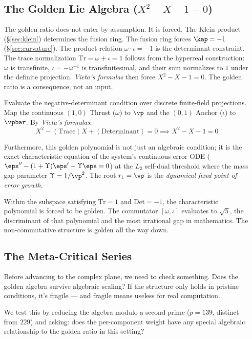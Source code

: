 \subsection{The Golden Lie Algebra ($X^2 - X - 1 = 0$)}\label{sec:golden}

The golden ratio does not enter by assumption. It is forced. The Klein product (\S\ref{sec:klein}) determines the fusion ring. The fusion ring forces $\kap = -1$ (\S\ref{sec:curvature}). The product relation $\omega \cdot \iota = -1$ is the determinant constraint. The trace normalization $\mathrm{Tr} = \omega + \iota = 1$ follows from the hyperreal construction: $\omega$ is transfinite, $\iota = -\omega^{-1}$ is transfinitesimal, and their sum normalizes to $1$ under the definite projection. \emph{Vieta's formulas} then force $X^2 - X - 1 = 0$. The golden ratio is a consequence, not an input.

Evaluate the negative-determinant condition over discrete finite-field projections. Map the continuous $(1,0)$ Thrust ($\omega$) to $\vp$ and the $(0,1)$ Anchor ($\iota$) to $\vpbar$. By \emph{Vieta's formulas}:
$$X^2 - (\text{Trace})X + (\text{Determinant}) = 0 \implies X^2 - X - 1 = 0$$

Furthermore, this golden polynomial is not just an algebraic condition; it is the exact characteristic equation of the system's continuous error ODE ($\eps'' - (1+\Upsilon)\eps' - \Upsilon\eps = 0$) at the $L_2$ self-dual threshold where the mass gap parameter $\Upsilon = 1/\vp^2$. The root $r_1 = \vp$ is the \emph{dynamical fixed point of error growth}.

Within the subspace satisfying $\mathrm{Tr} = 1$ and $\mathrm{Det} = -1$, the characteristic polynomial is forced to be golden. The commutator $[\omega, \iota]$ evaluates to $\sqrt{5}$, the discriminant of that polynomial and the most irrational gap in mathematics. The non-commutative structure is golden all the way down.

\subsection{The Meta-Critical Series}

Before advancing to the complex plane, we need to check something. Does the golden algebra survive algebraic scaling? If the structure only holds in pristine conditions, it's fragile --- and fragile means useless for real computation.

We test this by reducing the algebra modulo a second prime ($p = 139$, distinct from $229$) and asking: does the per-component weight have any special algebraic relationship to the golden ratio in this setting?

